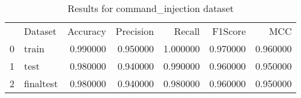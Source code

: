\begin{table}
\caption{Results for command_injection dataset}
\begin{tabular}{llrrrrr}
 & Dataset & Accuracy & Precision & Recall & F1Score & MCC \\
0 & train & 0.990000 & 0.950000 & 1.000000 & 0.970000 & 0.960000 \\
1 & test & 0.980000 & 0.940000 & 0.990000 & 0.960000 & 0.950000 \\
2 & finaltest & 0.980000 & 0.940000 & 0.980000 & 0.960000 & 0.950000 \\
\end{tabular}
\end{table}

